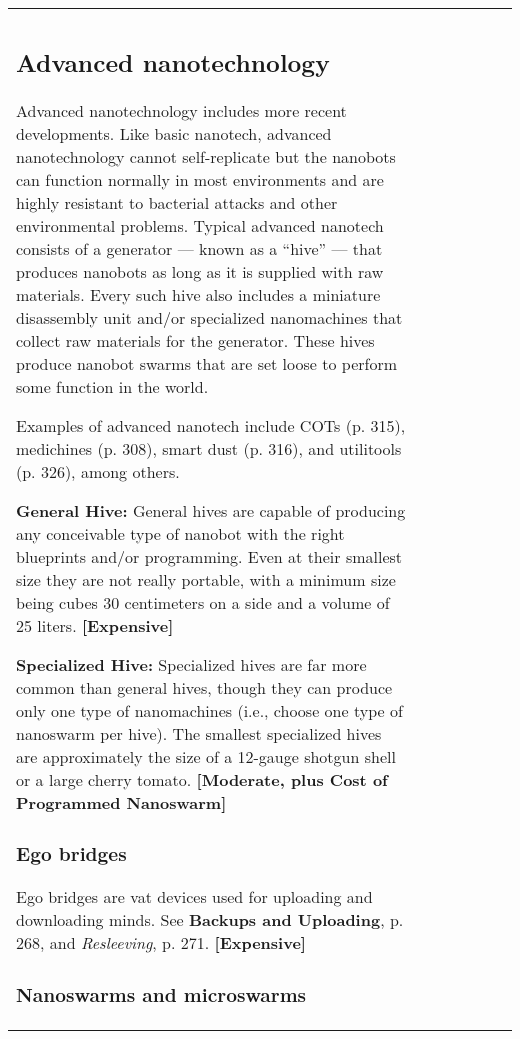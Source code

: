 \begin{tabular}{|l|l|l|l|l|l|l|}
\subsection{Advanced nanotechnology} \label{sec:advanced-nanotech} 

Advanced nanotechnology includes more recent developments. Like basic nanotech, advanced nanotechnology cannot self-replicate but the nanobots can function normally in most environments and are highly resistant to bacterial attacks and other environmental problems. Typical advanced nanotech consists of a generator --- known as a ``hive'' --- that produces nanobots as long as it is supplied with raw materials. Every such hive also includes a miniature disassembly unit and/or specialized nanomachines that collect raw materials for the generator. These hives produce nanobot swarms that are set loose to perform some function in the world. 

Examples of advanced nanotech include COTs (p. 315), medichines (p. 308), smart dust (p. 316), and utilitools (p. 326), among others. 

\textbf{General Hive:} General hives are capable of producing any conceivable type of nanobot with the right blueprints and/or programming. Even at their smallest size they are not really portable, with a minimum size being cubes 30 centimeters on a side and a volume of 25 liters. \textbf{[Expensive]} 

\textbf{Specialized Hive:} Specialized hives are far more common than general hives, though they can produce only one type of nanomachines (i.e., choose one type of nanoswarm per hive). The smallest specialized hives are approximately the size of a 12-gauge shotgun shell or a large cherry tomato. \textbf{[Moderate, plus Cost of Programmed Nanoswarm]} 

\subsubsection{Ego bridges} 

Ego bridges are vat devices used for uploading and downloading minds. See \textbf{Backups and Uploading}, p. 268, and \emph{Resleeving}, p. 271. \textbf{[Expensive]} 

\subsubsection{Nanoswarms and microswarms} 


\end{tabular}
